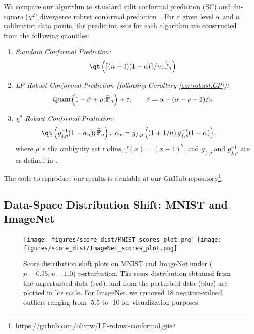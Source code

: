\documentclass[11pt,a4paper]{article}
\begin{document}
We compare our algorithm to standard split conformal prediction (SC) and chi-square ($\chi^2$) divergence robust conformal prediction~\cite{cauchois2024robust}. For a given level $\alpha$ and $n$ calibration data points, the prediction sets for each algorithm are constructed from the following quantiles:
\begin{enumerate}
    \item \textit{Standard Conformal Prediction: } \begin{align*}
    \qt\left({\lceil(n+1)(1-\alpha)\rceil}/{n}; \widehat{\mathbb{P}}_n\right)
    \end{align*}
    \item \textit{LP Robust Conformal Prediction (following Corollary \ref{cor:robust:CP}): }
    \begin{align*}
    \mathrm{Quant}\Bigl(1-\beta+\rho; \widehat{\mathbb{P}}_n\Bigr) + \varepsilon,\qquad \beta = \alpha + (\alpha-\rho-2)/n
    \end{align*}
    \item \textit{$\chi^2$ Robust Conformal Prediction: }
    \begin{align*}
    &\qt\left( g_{f,\rho}^{-1} (1-\alpha_n); \widehat{\mathbb{P}}_n \right), \ \alpha_n = g_{f,\rho} \left( \left(1 + {1}/{n} \right) g_{f,\rho}^{-1} (1 - \alpha) \right), 
    \end{align*}
where $\rho$ is the ambiguity set radius, $f(x) = (x-1)^2$, and $g_{f,\rho}$ and $g_{f,\rho}^{-1}$ are as defined in \cite{cauchois2024robust}.
\end{enumerate}
The code to reproduce our results is available at our GitHub repository\footnote{\url{https://github.com/olivrw/LP-robust-conformal.git}}.

\subsection{Data-Space Distribution Shift: MNIST and ImageNet}
\label{sec:datspace_exp}

\begin{figure}[t]
\centering
\texttt{[image: figures/score\_dist/MNIST\_scores\_plot.png]}
\texttt{[image: figures/score\_dist/ImageNet\_scores\_plot.png]}
\caption{Score distribution shift plots on MNIST and ImageNet under ($p=0.05, u=1.0$) perturbation. The score distribution obtained from the unperturbed data (red), and from the perturbed data (blue) are plotted in log scale. For ImageNet, we removed 18 negative-valued outliers ranging from -5.5 to -10 for visualization purposes.}
\label{fig:score_shift}
\end{figure}
\end{document}

